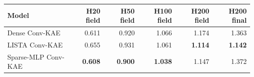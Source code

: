 \begin{tabular}{lrrrrr}
\toprule
Model & H20 field & H50 field & H100 field & H200 field & H200 final \\
\midrule
Dense Conv-KAE & 0.611 & 0.920 & 1.066 & 1.174 & 1.363 \\
LISTA Conv-KAE & 0.655 & 0.931 & 1.061 & \textbf{1.114} & \textbf{1.142} \\
Sparse-MLP Conv-KAE & \textbf{0.608} & \textbf{0.900} & \textbf{1.038} & 1.147 & 1.372 \\
\bottomrule
\end{tabular}

